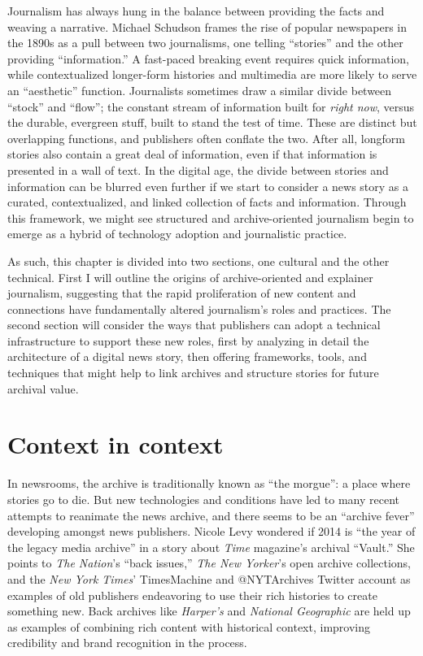 Journalism has always hung in the balance between providing the facts and weaving a narrative. Michael Schudson frames the rise of popular newspapers in the 1890s as a pull between two journalisms, one telling ``stories'' and the other providing ``information.'' A fast-paced breaking event requires quick information, while contextualized longer-form histories and multimedia are more likely to serve an ``aesthetic'' function.\autocite[89]{schudson_discovering_1978} Journalists sometimes draw a similar divide between ``stock'' and ``flow''; the constant stream of information built for \emph{right now}, versus the durable, evergreen stuff, built to stand the test of time.\autocite{sloan_stock_2010} These are distinct but overlapping functions, and publishers often conflate the two. After all, longform stories also contain a great deal of information, even if that information is presented in a wall of text. In the digital age, the divide between stories and information can be blurred even further if we start to consider a news story as a curated, contextualized, and linked collection of facts and information. Through this framework, we might see structured and archive-oriented journalism begin to emerge as a hybrid of technology adoption and journalistic practice.

As such, this chapter is divided into two sections, one cultural and the other technical. First I will outline the origins of archive-oriented and explainer journalism, suggesting that the rapid proliferation of new content and connections have fundamentally altered journalism's roles and practices. The second section will consider the ways that publishers can adopt a technical infrastructure to support these new roles, first by analyzing in detail the architecture of a digital news story, then offering frameworks, tools, and techniques that might help to link archives and structure stories for future archival value.

\section{Context in context}

In newsrooms, the archive is traditionally known as ``the morgue'': a place where stories go to die. But new technologies and conditions have led to many recent attempts to reanimate the news archive, and there seems to be an ``archive fever'' developing amongst news publishers. Nicole Levy wondered if 2014 is ``the year of the legacy media archive'' in a story about \emph{Time} magazine's archival ``Vault.''\autocite{levy_time.com_2014} She points to \emph{The Nation}'s ``back issues,'' \emph{The New Yorker}'s open archive collections, and the \emph{New York Times}' TimesMachine and @NYTArchives Twitter account as examples of old publishers endeavoring to use their rich histories to create something new. Back archives like \emph{Harper's} and \emph{National Geographic} are held up as examples of combining rich content with historical context, improving credibility and brand recognition in the process.

